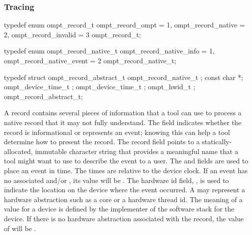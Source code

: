 \subsubsection{Tracing}
\label{sec:ompt-records}


\begin{ccppspecific}
\begin{omptEnum}
typedef enum ompt_record_t {
  ompt_record_ompt               = 1,
  ompt_record_native             = 2,
  ompt_record_invalid            = 3
} ompt_record_t;
\end{omptEnum}
\end{ccppspecific}


\label{sec:ompt_record_native_t}


\begin{ccppspecific}
\begin{omptEnum}
typedef enum ompt_record_native_t {
  ompt_record_native_info  = 1,
  ompt_record_native_event = 2
} ompt_record_native_t;
\end{omptEnum}
\end{ccppspecific}


\label{sec:ompt_record_abstract_t}


\begin{ccppspecific}
\begin{omptRecord}
typedef struct ompt_record_abstract_t {
  ompt_record_native_t ;
  const char *;
  ompt_device_time_t ;
  ompt_device_time_t ;
  ompt_hwid_t ;
} ompt_record_abstract_t;
\end{omptRecord}
\end{ccppspecific}


\descr

A  record contains several
pieces of information that a tool can use to process a native record
that it may not fully understand. The  field
indicates whether the record is informational
or represents an event; knowing this can help a tool determine
how to present the record. The record  field points to
a statically-allocated, immutable character string that provides
a meaningful name that a tool might want to use to describe the event
to a user. The  and  fields are
used to place an event in time. The times are relative to the device
clock. If an event has no associated  and/or
, its value will be
. The hardware id field,
,  is used to indicate the location on the device where
the event occurred. A  may represent a hardware abstraction
such as a core or a hardware thread id. The meaning of a 
value for a device is defined by the implementer of the software
stack for the device. If there is no hardware abstraction associated
with the record, the value of 
will be .

